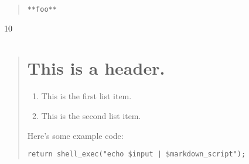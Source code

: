 \begin{quote}
\end{quote}

\begin{quote}
\begin{verbatim}
**foo**
\end{verbatim}
\end{quote}

10

\begin{quote}
\chapter{This is a header.}
\label{thisisaheader.}

\begin{enumerate}
\item This is the first list item.

\item This is the second list item.

\end{enumerate}

Here's some example code:

\begin{verbatim}
return shell_exec("echo $input | $markdown_script");
\end{verbatim}
\end{quote}



